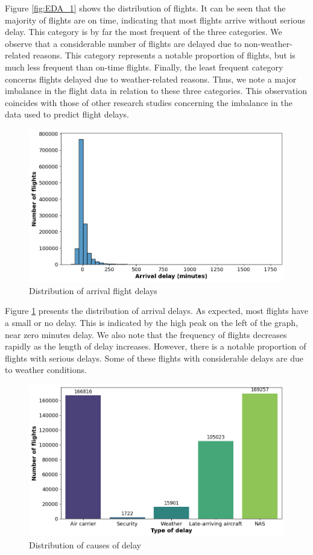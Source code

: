 \documentclass[12pt,oneside]{book} %
\begin{document}
\noindent Figure \ref{fig:EDA_1} shows the distribution of flights. It can be seen that the majority of flights are on time, indicating that most flights arrive without serious delay. This category is by far the most frequent of the three categories. We observe that a considerable number of flights are delayed due to non-weather-related reasons. This category represents a notable proportion of flights, but is much less frequent than on-time flights. Finally, the least frequent category concerns flights delayed due to weather-related reasons. Thus, we note a major imbalance in the flight data in relation to these three categories. This observation coincides with those of other research studies concerning the imbalance in the data used to predict flight delays.

\begin{figure}[H]
    \centering
    \includegraphics[width=0.85\linewidth]{Image/EDA_2.png}
    \caption{\centering Distribution of arrival flight delays}
    \label{fig:EDA_2}
\end{figure}

\noindent Figure \ref{fig:EDA_2} presents the distribution of arrival delays. As expected, most flights have a small or no delay. This is indicated by the high peak on the left of the graph, near zero minutes delay. We also note that the frequency of flights decreases rapidly as the length of delay increases. However, there is a notable proportion of flights with serious delays. Some of these flights with considerable delays are due to weather conditions. 

\begin{figure}[H]
    \centering
    \includegraphics[width=0.85\linewidth]{Image/EDA_3.png}
    \caption{\centering Distribution of causes of delay}
    \label{fig:EDA_3}
\end{figure}
\end{document}
